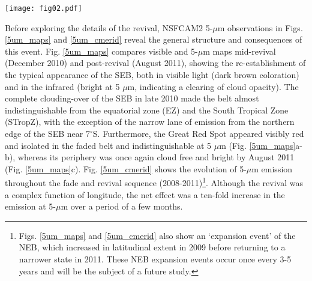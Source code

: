 \documentclass[final,authoryear,5p,times,twocolumn]{elsarticle}
\begin{document}
\begin{figure*}
\begin{centering}
\centerline{\texttt{[image: fig02.pdf]}}
\caption{Central-meridian brightnesses extracted from all NSFCAM2 images at 4.7 $\mu$m during the SEB fade and revival sequence.  Radiances were averaged within $\pm50^\circ$ longitude of the central meridian for each image.  The top panel is identical to that shown by \citet{11fletcher_fade}, the bottom panel shows the new data between November 2010 and September 2011. In the absence of an absolute radiometric calibration, all radiance values have been normalised so that the equatorial brightness remains approximately unchanged.  In addition to the recovery of brightness over the SEB, an expansion and contraction event can be observed in the NEB between 2009-2011. }
\label{5um_cmerid}
\end{centering}
\end{figure*}

Before exploring the details of the revival, NSFCAM2 5-$\mu$m observations in Figs. \ref{5um_maps}  and \ref{5um_cmerid} reveal the general structure and consequences of this event.  Fig. \ref{5um_maps} compares visible and 5-$\mu$m maps mid-revival (December 2010) and post-revival (August 2011), showing the re-establishment of the typical appearance of the SEB, both in visible light (dark brown coloration) and in the infrared (bright at 5 $\mu$m, indicating a clearing of cloud opacity).  The complete clouding-over of the SEB in late 2010 made the belt almost indistinguishable from the equatorial zone (EZ) and the South Tropical Zone (STropZ), with the exception of the narrow lane of emission from the northern edge of the SEB near $7^\circ$S.  Furthermore, the Great Red Spot appeared visibly red and isolated in the faded belt and indistinguishable at 5 $\mu$m (Fig. \ref{5um_maps}a-b), whereas its periphery was once again cloud free and bright by August 2011 (Fig. \ref{5um_maps}c).  Fig. \ref{5um_cmerid} shows the evolution of 5-$\mu$m emission throughout the fade and revival sequence (2008-2011)\footnote{Figs. \ref{5um_maps} and \ref{5um_cmerid} also show an `expansion event' of the NEB, which increased in latitudinal extent in 2009 before returning to a narrower state in 2011.  These NEB expansion events occur once every 3-5 years and will be the subject of a future study.}.  Although the revival was a complex function of longitude, the net effect was a ten-fold increase in the emission at 5-$\mu$m over a period of a few months.
\end{document}

